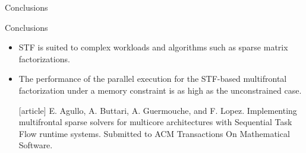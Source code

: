 \begin{frame}{Conclusions}

  \begin{block}{Conclusions}
    
    \begin{itemize}
    \item STF is suited to complex workloads and
      algorithms such as sparse matrix factorizations.

    \item The performance of the parallel execution for the STF-based
      multifrontal factorization under a memory constraint is as high as
      the unconstrained case.

      
      {\scriptsize \begin{thebibliography}{9}
        [article]
       E. Agullo, A. Buttari, A. Guermouche, and
        F. Lopez.  \newblock Implementing multifrontal sparse solvers
        for multicore architectures with Sequential Task Flow runtime
        systems.  \newblock Submitted to ACM Transactions On
        Mathematical Software.
      \end{thebibliography}}

    \end{itemize}

  \end{block}
  
\end{frame}

